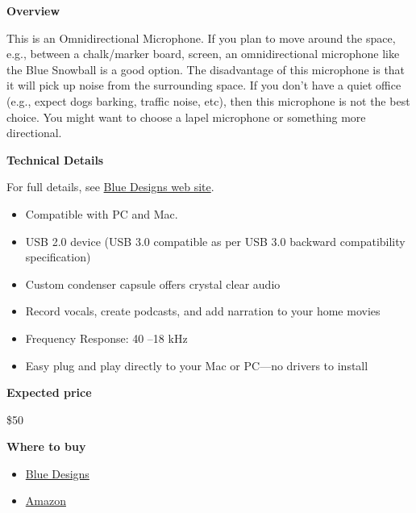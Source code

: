 \begin{gram}

\textbf{Overview}

This is an Omnidirectional Microphone. If you plan to move around the
space, e.g., between a chalk/marker board, screen, an omnidirectional
microphone like the Blue Snowball is a good option.
%
The disadvantage of this microphone is that it will pick up noise from the surrounding space.
%
If you don't have a quiet office (e.g., expect dogs barking, traffic noise, etc), then this microphone is not the best choice.  
%
You might want to choose a lapel microphone or something more directional.


\textbf{Technical Details}

For full details, see \href{https://www.bluedesigns.com/products/snowball-ice/}{Blue Designs web site}.

\begin{itemize}
\item
Compatible with PC and Mac.

\item  USB 2.0 device (USB 3.0 compatible as per USB 3.0 backward compatibility specification)

\item Custom condenser capsule offers crystal clear audio

\item Record vocals, create podcasts, and add narration to your home movies

\item Frequency Response: 40 –18 kHz

\item Easy plug and play directly to your Mac or PC—no drivers to install
\end{itemize}



\textbf{Expected price}

\$50


\textbf{Where to buy}


\begin{itemize}
\item 
\href{https://www.bluedesigns.com/products/snowball-ice/}{Blue Designs}

\item 
\href{https://www.amazon.com/Blue-Snowball-Condenser-Microphone-Cardioid/dp/B006DIA77E/ref=sxin_2_ac_d_rm?ac_md=1-1-c25vd2JhbGwgbWljcm9waG9uZQ%3D%3D-ac_d_rm&crid=35T8W1KNGCU61&cv_ct_cx=blue+yeti+usb+microphone&keywords=blue+yeti+usb+microphone&pd_rd_i=B006DIA77E&pd_rd_r=3aa58f9d-30b3-4a94-a0f9-899d4ec51554&pd_rd_w=TANss&pd_rd_wg=OOiJB&pf_rd_p=ec111f65-4a46-499c-be78-f47997212bd0&pf_rd_r=BKY12JJMDCSM54ABWTDX&psc=1&qid=1582900292&sprefix=Blue+ye,aps,168}{Amazon}
\end{itemize}

\end{gram}


